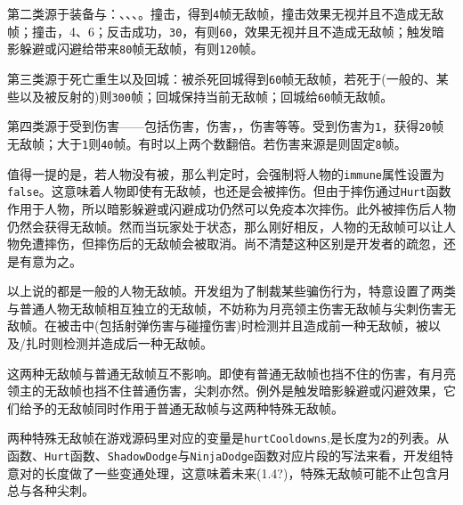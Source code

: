 第二类源于装备与：、、、。撞击，得到\lstinline{4}帧无敌帧，撞击效果无视并且不造成无敌帧；撞击，4、6；反击成功，\lstinline{30}，有则\lstinline{60}，效果无视并且不造成无敌帧；触发暗影躲避或闪避给带来\lstinline{80}帧无敌帧，有则\lstinline{120}帧。

第三类源于死亡重生以及回城：被杀死回城得到\lstinline{60}帧无敌帧，若死于(一般的、某些以及被反射的)则\lstinline{300}帧；回城保持当前无敌帧；回城给\lstinline{60}帧无敌帧。

第四类源于受到伤害——包括伤害，伤害，，伤害等等。受到伤害为\lstinline{1}，获得\lstinline{20}帧无敌帧；大于\lstinline{1}则\lstinline{40}帧。有时以上两个数翻倍。若伤害来源是则固定\lstinline{8}帧。

值得一提的是，若人物没有被，那么判定时，会强制将人物的\lstinline{immune}属性设置为\lstinline{false}。这意味着人物即使有无敌帧，也还是会被摔伤。但由于摔伤通过\lstinline{Hurt}函数作用于人物，所以暗影躲避或闪避成功仍然可以免疫本次摔伤。此外被摔伤后人物仍然会获得无敌帧。然而当玩家处于状态，那么刚好相反，人物的无敌帧可以让人物免遭摔伤，但摔伤后的无敌帧会被取消。尚不清楚这种区别是开发者的疏忽，还是有意为之。

以上说的都是一般的人物无敌帧。开发组为了制裁某些骗伤行为，特意设置了两类与普通人物无敌帧相互独立的无敌帧，不妨称为月亮领主伤害无敌帧与尖刺伤害无敌帧。在被击中(包括射弹伤害与碰撞伤害)时检测并且造成前一种无敌帧，被以及/扎时则检测并造成后一种无敌帧。

这两种无敌帧与普通无敌帧互不影响。即使有普通无敌帧也挡不住的伤害，有月亮领主的无敌帧也挡不住普通伤害，尖刺亦然。例外是触发暗影躲避或闪避效果，它们给予的无敌帧同时作用于普通无敌帧与这两种特殊无敌帧。

两种特殊无敌帧在游戏源码里对应的变量是\lstinline{hurtCooldowns},是长度为\lstinline{2}的列表。从函数、\lstinline{Hurt}函数、\lstinline{ShadowDodge}与\lstinline{NinjaDodge}函数对应片段的写法来看，开发组特意对的长度做了一些变通处理，这意味着未来(1.4?)，特殊无敌帧可能不止包含月总与各种尖刺。
